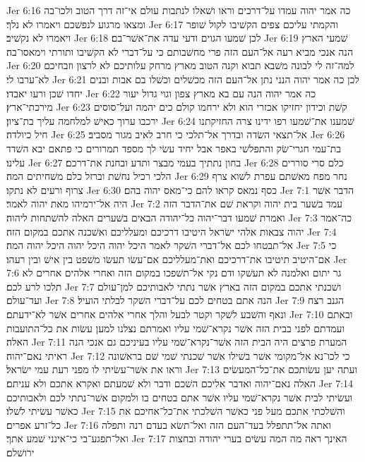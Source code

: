 Jer 6:16  כה אמר יהוה עמדו על־דרכים וראו ושׁאלו לנתבות עולם אי־זה דרך הטוב ולכו־בה ומצאו מרגוע לנפשׁכם ויאמרו לא נלך׃
Jer 6:17  והקמתי עליכם צפים הקשׁיבו לקול שׁופר ויאמרו לא נקשׁיב׃
Jer 6:18  לכן שׁמעו הגוים ודעי עדה את־אשׁר־בם׃
Jer 6:19  שׁמעי הארץ הנה אנכי מביא רעה אל־העם הזה פרי מחשׁבותם כי על־דברי לא הקשׁיבו ותורתי וימאסו־בה׃
Jer 6:20  למה־זה לי לבונה משׁבא תבוא וקנה הטוב מארץ מרחק עלותיכם לא לרצון וזבחיכם לא־ערבו לי׃
Jer 6:21  לכן כה אמר יהוה הנני נתן אל־העם הזה מכשׁלים וכשׁלו בם אבות ובנים יחדו שׁכן ורעו יאבדו׃
Jer 6:22  כה אמר יהוה הנה עם בא מארץ צפון וגוי גדול יעור מירכתי־ארץ׃
Jer 6:23  קשׁת וכידון יחזיקו אכזרי הוא ולא ירחמו קולם כים יהמה ועל־סוסים ירכבו ערוך כאישׁ למלחמה עליך בת־ציון׃
Jer 6:24  שׁמענו את־שׁמעו רפו ידינו צרה החזיקתנו חיל כיולדה׃
Jer 6:25  אל־תצאי השׂדה ובדרך אל־תלכי כי חרב לאיב מגור מסביב׃
Jer 6:26  בת־עמי חגרי־שׂק והתפלשׁי באפר אבל יחיד עשׂי לך מספד תמרורים כי פתאם יבא השׁדד עלינו׃
Jer 6:27  בחון נתתיך בעמי מבצר ותדע ובחנת את־דרכם׃
Jer 6:28  כלם סרי סוררים הלכי רכיל נחשׁת וברזל כלם משׁחיתים המה׃
Jer 6:29  נחר מפח מאשׁתם עפרת לשׁוא צרף צרוף ורעים לא נתקו׃
Jer 6:30  כסף נמאס קראו להם כי־מאס יהוה בהם׃
Jer 7:1  הדבר אשׁר היה אל־ירמיהו מאת יהוה לאמר׃
Jer 7:2  עמד בשׁער בית יהוה וקראת שׁם את־הדבר הזה ואמרת שׁמעו דבר־יהוה כל־יהודה הבאים בשׁערים האלה להשׁתחות ליהוה׃
Jer 7:3  כה־אמר יהוה צבאות אלהי ישׂראל היטיבו דרכיכם ומעלליכם ואשׁכנה אתכם במקום הזה׃
Jer 7:4  אל־תבטחו לכם אל־דברי השׁקר לאמר היכל יהוה היכל יהוה היכל יהוה המה׃
Jer 7:5  כי אם־היטיב תיטיבו את־דרכיכם ואת־מעלליכם אם־עשׂו תעשׂו משׁפט בין אישׁ ובין רעהו׃
Jer 7:6  גר יתום ואלמנה לא תעשׁקו ודם נקי אל־תשׁפכו במקום הזה ואחרי אלהים אחרים לא תלכו לרע לכם׃
Jer 7:7  ושׁכנתי אתכם במקום הזה בארץ אשׁר נתתי לאבותיכם למן־עולם ועד־עולם׃
Jer 7:8  הנה אתם בטחים לכם על־דברי השׁקר לבלתי הועיל׃
Jer 7:9  הגנב רצח ונאף והשׁבע לשׁקר וקטר לבעל והלך אחרי אלהים אחרים אשׁר לא־ידעתם׃
Jer 7:10  ובאתם ועמדתם לפני בבית הזה אשׁר נקרא־שׁמי עליו ואמרתם נצלנו למען עשׂות את כל־התועבות האלה׃
Jer 7:11  המערת פרצים היה הבית הזה אשׁר־נקרא־שׁמי עליו בעיניכם גם אנכי הנה ראיתי נאם־יהוה׃
Jer 7:12  כי לכו־נא אל־מקומי אשׁר בשׁילו אשׁר שׁכנתי שׁמי שׁם בראשׁונה וראו את אשׁר־עשׂיתי לו מפני רעת עמי ישׂראל׃
Jer 7:13  ועתה יען עשׂותכם את־כל־המעשׂים האלה נאם־יהוה ואדבר אליכם השׁכם ודבר ולא שׁמעתם ואקרא אתכם ולא עניתם׃
Jer 7:14  ועשׂיתי לבית אשׁר נקרא־שׁמי עליו אשׁר אתם בטחים בו ולמקום אשׁר־נתתי לכם ולאבותיכם כאשׁר עשׂיתי לשׁלו׃
Jer 7:15  והשׁלכתי אתכם מעל פני כאשׁר השׁלכתי את־כל־אחיכם את כל־זרע אפרים׃
Jer 7:16  ואתה אל־תתפלל בעד־העם הזה ואל־תשׂא בעדם רנה ותפלה ואל־תפגע־בי כי־אינני שׁמע אתך׃
Jer 7:17  האינך ראה מה המה עשׂים בערי יהודה ובחצות ירושׁלם׃
